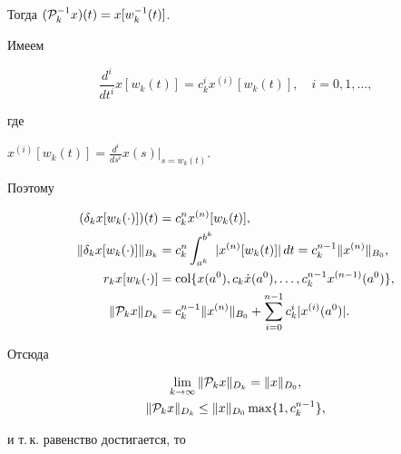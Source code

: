 Тогда $({\cal P}_k^{-1}x)(t)= x[w_k^{-1}(t)]$.


Имеем


$$


\frac{d^i}{dt^i}x[w_k(t)]=c^i_k


x^{(i)}[w_k(t)],\quad i=0,1,\dotsc,


$$


где


$\displaystyle


x^{(i)}[w_k(t)]=\frac{d^i}{ds^i} x(s)\Big|_{s=w_k(t)}$.


Поэтому


\begin{align*}


(\delta_k x[w_k(\cdot)])(t) &= c^n_k


x^{(n)}[w_k(t)], \\


%


\|\delta_kx[w_k(\cdot)]\|_{B_k} &= c^n_k


\int_{a^k}^{b^k} |x^{(n)}[w_k(t)]|\,dt = c^{n-1}_k


\|x^{(n)}\|_{B_0}, \\


%


r_k x[w_k(\cdot)] &= \col\{ x(a^0),


c_k\Dot{x}(a^0),\dotsc,


c^{n-1}_kx^{(n-1)}(a^0)\}, \\


%


\|{\cal P}_k x\|_{D_k} &=


c^{n-1}_k \|x^{(n)}\|_{B_0}


+ \sum_{i=0}^{n-1} c^i_k


|x^{(i)}(a^0)|.


\end{align*}


Отсюда


\begin{gather*}


\lim_{k\to\infty}\|{\cal P}_kx\|_{D_k} = \|x\|_{D_0},\\


%


\|{\cal P}_kx\|_{D_k} \leq \|x\|_{D_0} 


\max \{1, c^{n-1}_k\},


\end{gather*}


и т.\,к. равенство достигается, то


$$



